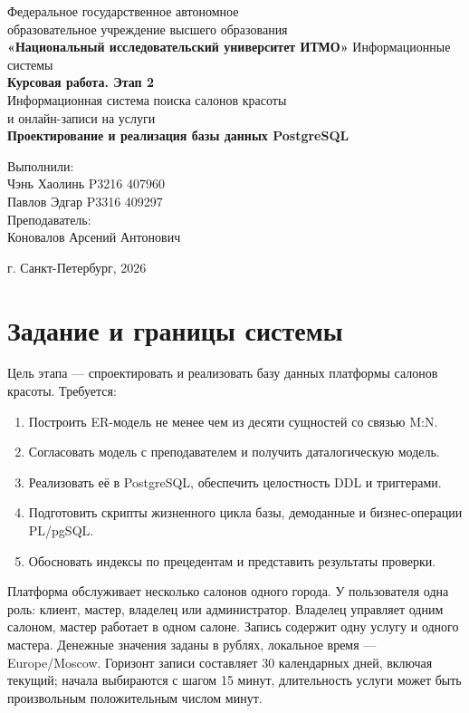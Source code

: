 \documentclass[11pt,a4paper]{article}
\begin{document}
\begin{titlepage}\centering
Федеральное государственное автономное\\образовательное учреждение высшего образования\\
\textbf{«Национальный исследовательский университет ИТМО»}\vfill
Информационные системы\\[0.5\baselineskip]\textbf{Курсовая работа. Этап 2}\\[0.5\baselineskip]
Информационная система поиска салонов красоты\\и онлайн-записи на услуги\\[0.5\baselineskip]
\textbf{Проектирование и реализация базы данных PostgreSQL}\vfill
\begin{flushright}Выполнили:\\Чэнь Хаолинь P3216 407960\\Павлов Эдгар P3316 409297\\Преподаватель:\\Коновалов Арсений Антонович\end{flushright}
\vspace{4\baselineskip}г. Санкт-Петербург, 2026\end{titlepage}
\setcounter{page}{2}\tableofcontents\clearpage


\section{Задание и границы системы}
Цель этапа --- спроектировать и реализовать базу данных платформы салонов красоты. Требуется:
\begin{enumerate}
\item Построить ER-модель не менее чем из десяти сущностей со связью M:N.
\item Согласовать модель с преподавателем и получить даталогическую модель.
\item Реализовать её в PostgreSQL, обеспечить целостность DDL и триггерами.
\item Подготовить скрипты жизненного цикла базы, демоданные и бизнес-операции PL/pgSQL.
\item Обосновать индексы по прецедентам и представить результаты проверки.
\end{enumerate}
Платформа обслуживает несколько салонов одного города. У пользователя одна роль: клиент, мастер, владелец или администратор. Владелец управляет одним салоном, мастер работает в одном салоне. Запись содержит одну услугу и одного мастера. Денежные значения заданы в рублях, локальное время --- Europe/Moscow. Горизонт записи составляет 30 календарных дней, включая текущий; начала выбираются с шагом 15 минут, длительность услуги может быть произвольным положительным числом минут.
\end{document}
